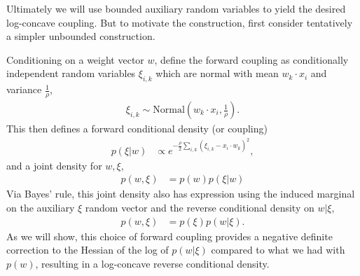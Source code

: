 \documentclass{article}
\numberwithin{equation}{section}
\theoremstyle{Lemma}
\theoremstyle{Corollary}
\theoremstyle{Theorem}
\theoremstyle{Remark}
\begin{document}
Ultimately we will use bounded auxiliary random variables to yield the desired log-concave coupling.  But to motivate the construction, first consider tentatively a simpler unbounded construction.

Conditioning on a weight vector $w$, define the forward coupling as conditionally independent random variables $\xi_{i,k}$ which are normal with mean $w_{k}\!\cdot\!x_{i}$ and variance $\frac{1}{\rho}$, 
\begin{align}
    \xi_{i,k} \sim \text{Normal}(w_{k}\!\cdot\!x_{i}, \frac{1}{\rho}).
\end{align}
This then defines a forward conditional density (or coupling)
\begin{align}
    p(\xi|w)&\propto e^{-\frac{\rho}{2}\sum_{i,k}(\xi_{i,k}-x_{i}\cdot w_{k})^{2}},
\end{align}
and a joint density for $w,\xi$,
\begin{align}
    p(w, \xi)&= p(w)p(\xi|w)
\end{align}
Via Bayes' rule, this joint density also has expression using the induced marginal on the auxiliary $\xi$ random vector and the reverse conditional density on $w|\xi$,
\begin{align}
    p(w,\xi)&= p(\xi)p(w|\xi).
\end{align} 
As we will show, this choice of forward coupling provides a negative definite correction to the Hessian of the log of $p(w|\xi)$ compared to what we had with $p(w)$, resulting in a log-concave reverse conditional density.
\end{document}
